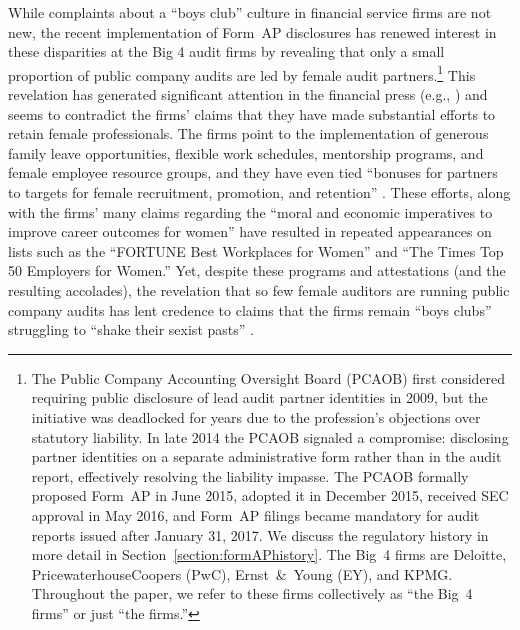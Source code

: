 \documentclass[11pt]{article}
\begin{document}
    While complaints about a ``boys club'' culture in financial service firms are not new, the recent implementation of Form~AP disclosures has renewed interest in these disparities at the Big 4 audit firms by revealing that only a small proportion of public company audits are led by female audit partners.\footnote{The Public Company Accounting Oversight Board (PCAOB) first considered requiring public disclosure of lead audit partner identities in 2009, but the initiative was deadlocked for years due to the profession's objections over statutory liability. In late 2014 the PCAOB signaled a compromise: disclosing partner identities on a separate administrative form rather than in the audit report, effectively resolving the liability impasse. The PCAOB formally proposed Form~AP in June 2015, adopted it in December 2015, received SEC approval in May 2016, and Form~AP filings became mandatory for audit reports issued after January 31, 2017. We discuss the regulatory history in more detail in Section~\ref{section:formAPhistory}. The Big~4 firms are Deloitte, PricewaterhouseCoopers (PwC), Ernst~\&~Young (EY), and KPMG. Throughout the paper, we refer to these firms collectively as ``the Big~4 firms'' or just ``the firms.''} This revelation has generated significant attention in the financial press (e.g., \cite{rapoportWomenRarelyRun2018, lucasWhyFewWomen2025,kissinBigFourAccounting2025}) and seems to contradict the firms' claims that they have made substantial efforts to retain female professionals. The firms point to the implementation of generous family leave opportunities, flexible work schedules, mentorship programs, and female employee resource groups, and they have even tied ``bonuses for partners to targets for female recruitment, promotion, and retention'' \parencite{marriageBigFourAccountants2018}. These efforts, along with the firms' many claims regarding the ``moral and economic imperatives to improve career outcomes for women'' have resulted in repeated appearances on lists such as the ``FORTUNE Best Workplaces for Women'' and ``The Times Top 50 Employers for Women.'' Yet, despite these programs and attestations (and the resulting accolades), the revelation that so few female auditors are running public company audits has lent credence to claims that the firms remain ``boys clubs'' struggling to ``shake their sexist pasts'' \parencite{kellsBigFourAccounting2018}. 
    
\end{document}
